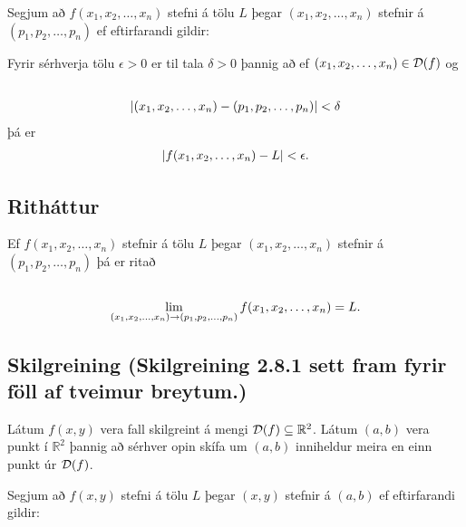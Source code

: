 \documentclass[a4paper,10pt,icelandic]{sphinxmanual}
\begin{document}
Segjum að \(f(x_1,x_2,\ldots,x_n)\) stefni á tölu \(L\) þegar
\((x_1,x_2,\ldots,x_n)\) stefnir á \((p_1,p_2,\ldots,p_n)\) ef
eftirfarandi gildir:

Fyrir sérhverja tölu \(\epsilon>0\) er til tala \(\delta>0\)
þannig að ef \((x_1,x_2,\ldots,x_n)\in{\cal D}(f)\) og
\begin{gather}
\begin{split}\displaystyle\end{split}\notag\\\begin{split}|(x_1,x_2,\ldots,x_n)-(p_1,p_2,\ldots,p_n)|<\delta\end{split}\notag
\end{gather}
þá er
\begin{gather}
\begin{split}\displaystyle
|f(x_1,x_2,\ldots,x_n)-L|<\epsilon.\end{split}\notag
\end{gather}

\subsection{Ritháttur}
\label{Kafli2:rithattur}
Ef \(f(x_1,x_2,\ldots,x_n)\) stefnir á tölu \(L\) þegar
\((x_1,x_2,\ldots,x_n)\) stefnir á \((p_1,p_2,\ldots,p_n)\) þá
er ritað
\begin{gather}
\begin{split}\displaystyle\end{split}\notag\\\begin{split}\lim_{(x_1,x_2,\ldots,x_n)\rightarrow (p_1,p_2,\ldots,p_n)}
f(x_1,x_2,\ldots,x_n)=L.\end{split}\notag
\end{gather}

\subsection{Skilgreining (Skilgreining 2.8.1 sett fram fyrir föll af tveimur breytum.)}
\label{Kafli2:skilgreining-skilgreining-2-8-1-sett-fram-fyrir-foll-af-tveimur-breytum}
Látum \(f(x,y)\) vera fall skilgreint á mengi
\({\cal D}(f)\subseteq {\mathbb  R}^2\). Látum \((a,b)\) vera
punkt í \({\mathbb  R}^2\) þannig að sérhver opin skífa um
\((a,b)\) inniheldur meira en einn punkt úr \({\cal D}(f)\).

Segjum að \(f(x,y)\) stefni á tölu \(L\) þegar \((x,y)\)
stefnir á \((a,b)\) ef eftirfarandi gildir:
\end{document}
